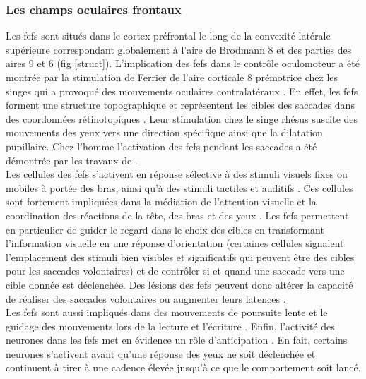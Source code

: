 \subsubsection{Les champs oculaires frontaux}
Les \glspl{fef} sont situés dans le cortex préfrontal le long de la convexité latérale supérieure correspondant globalement à l'aire de Brodmann 8 et des parties des aires 9 et 6 \cite{Bruce:1985} (fig \ref{struct}). L'implication des \glspl{fef} dans le contrôle oculomoteur a été montrée par la stimulation de Ferrier de l'aire corticale 8 prémotrice chez les singes qui a provoqué des mouvements oculaires contralatéraux \cite{Ferrier:1874}. En effet, les \glspl{fef} forment une structure topographique et représentent les cibles des saccades dans des coordonnées rétinotopiques \cite{Bruce:1985}. Leur stimulation chez le singe rhésus suscite des mouvements des yeux vers une direction spécifique ainsi que la dilatation pupillaire. Chez l'homme l'activation des \glspl{fef} pendant les saccades a été démontrée par les travaux de \cite{Melamed:1979, Petit:1993}.\\

Les cellules des \glspl{fef} s'activent en réponse sélective à des stimuli visuels fixes ou mobiles à portée des bras, ainsi qu'à des stimuli tactiles et auditifs \cite{Rizzolatti:1981}. Ces cellules sont fortement impliquées dans la médiation de l'attention visuelle et la coordination des réactions de la tête, des bras et des yeux \cite{Denny:1966, Gottlieb:1994, Macavoy:1991, Pragay:1987, Segraves:1987, Wagman:1961}. Les \glspl{fef} permettent en particulier de guider le regard dans le choix des cibles en transformant l'information visuelle en une réponse d'orientation \cite {Schall:2002, Schall:2004, Wurtz:1980, Segraves:1987} (certaines cellules signalent l'emplacement des stimuli bien visibles et significatifs qui peuvent être des cibles pour les saccades volontaires) et de contrôler si et quand une saccade vers une cible donnée est déclenchée. Des lésions des \glspl{fef} peuvent donc altérer la capacité de réaliser des saccades volontaires ou augmenter leurs latences \cite{Stuphorn:2002, Macavoy:1991, Schall:2002}.\\

Les \glspl{fef} sont aussi impliqués dans des mouvements de poursuite lente \cite{Gottlieb:1994} et le guidage des mouvements lors de la lecture et l'écriture \cite{Ritaccio:1992}. Enfin, l'activité des neurones dans les \glspl{fef} met en évidence un rôle d'anticipation \cite{Gottlieb:1994, Pragay:1987}. En fait, certains neurones s'activent avant qu'une réponse des yeux ne soit déclenchée et continuent à tirer à une cadence élevée jusqu'à ce que le comportement soit lancé. \\




